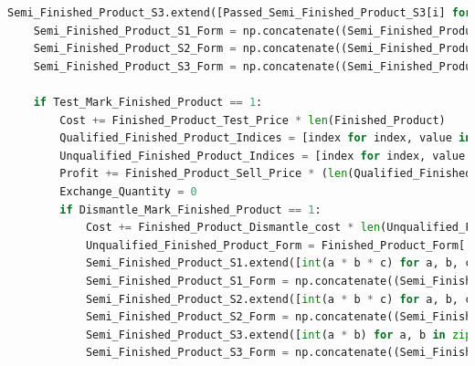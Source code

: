\documentclass[withoutpreface,bwprint]{cumcmthesis} %
\begin{document}
\begin{appendices}
\begin{lstlisting}[language=python]
    Semi_Finished_Product_S3.extend([Passed_Semi_Finished_Product_S3[i] for i in range(len(Passed_Semi_Finished_Product_S3)) if i not in Selected_Indices_Semi_Finished_Product_S3])
    Semi_Finished_Product_S1_Form = np.concatenate((Semi_Finished_Product_S1_Form, Passed_Semi_Finished_Product_S1_Form[:, [Passed_Semi_Finished_Product_S1[i] for i in range(len(Passed_Semi_Finished_Product_S1)) if i not in Selected_Indices_Semi_Finished_Product_S1]]), axis=1)
    Semi_Finished_Product_S2_Form = np.concatenate((Semi_Finished_Product_S2_Form, Passed_Semi_Finished_Product_S2_Form[:, [Passed_Semi_Finished_Product_S2[i] for i in range(len(Passed_Semi_Finished_Product_S2)) if i not in Selected_Indices_Semi_Finished_Product_S2]]), axis=1)
    Semi_Finished_Product_S3_Form = np.concatenate((Semi_Finished_Product_S3_Form, Passed_Semi_Finished_Product_S3_Form[:, [Passed_Semi_Finished_Product_S3[i] for i in range(len(Passed_Semi_Finished_Product_S3)) if i not in Selected_Indices_Semi_Finished_Product_S3]]), axis=1)

    if Test_Mark_Finished_Product == 1:
        Cost += Finished_Product_Test_Price * len(Finished_Product)
        Qualified_Finished_Product_Indices = [index for index, value in enumerate(Finished_Product) if value == 1]
        Unqualified_Finished_Product_Indices = [index for index, value in enumerate(Finished_Product) if value == 0]
        Profit += Finished_Product_Sell_Price * (len(Qualified_Finished_Product_Indices) - Exchange_Quantity)
        Exchange_Quantity = 0
        if Dismantle_Mark_Finished_Product == 1:
            Cost += Finished_Product_Dismantle_cost * len(Unqualified_Finished_Product_Indices)
            Unqualified_Finished_Product_Form = Finished_Product_Form[:, Unqualified_Finished_Product_Indices]
            Semi_Finished_Product_S1.extend([int(a * b * c) for a, b, c in zip(Unqualified_Finished_Product_Form[0], Unqualified_Finished_Product_Form[1], Unqualified_Finished_Product_Form[2])])
            Semi_Finished_Product_S1_Form = np.concatenate((Semi_Finished_Product_S1_Form, np.array([Unqualified_Finished_Product_Form[0].tolist(), Unqualified_Finished_Product_Form[1].tolist(), Unqualified_Finished_Product_Form[2].tolist()])), axis=1)
            Semi_Finished_Product_S2.extend([int(a * b * c) for a, b, c in zip(Unqualified_Finished_Product_Form[3], Unqualified_Finished_Product_Form[4], Unqualified_Finished_Product_Form[5])])
            Semi_Finished_Product_S2_Form = np.concatenate((Semi_Finished_Product_S2_Form, np.array([Unqualified_Finished_Product_Form[3].tolist(), Unqualified_Finished_Product_Form[4].tolist(), Unqualified_Finished_Product_Form[5].tolist()])), axis=1)
            Semi_Finished_Product_S3.extend([int(a * b) for a, b in zip(Unqualified_Finished_Product_Form[6], Unqualified_Finished_Product_Form[7])])
            Semi_Finished_Product_S3_Form = np.concatenate((Semi_Finished_Product_S3_Form, np.array([Unqualified_Finished_Product_Form[6].tolist(), Unqualified_Finished_Product_Form[7].tolist()])), axis=1)


\end{lstlisting}
\end{appendices}
\end{document}
